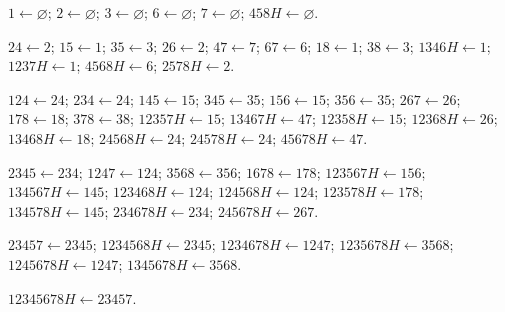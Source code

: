 \documentclass[a4paper,fleqn,longmktitle]{cas-sc}
\theoremstyle{definition}
\theoremstyle{remark}
\begin{document}
\begin{description}[leftmargin=1.8em,style=nextline]
\item[$\mathcal A_1\leftarrow\mathcal A_0$]
$1\leftarrow\varnothing$;
$2\leftarrow\varnothing$;
$3\leftarrow\varnothing$;
$6\leftarrow\varnothing$;
$7\leftarrow\varnothing$;
$458H\leftarrow\varnothing$.

\item[$\mathcal A_2\leftarrow\mathcal A_1$]
$24\leftarrow2$; $15\leftarrow1$; $35\leftarrow3$;
$26\leftarrow2$; $47\leftarrow7$; $67\leftarrow6$;
$18\leftarrow1$; $38\leftarrow3$; $1346H\leftarrow1$;
$1237H\leftarrow1$; $4568H\leftarrow6$; $2578H\leftarrow2$.

\item[$\mathcal A_3\leftarrow\mathcal A_2$]
$124\leftarrow24$; $234\leftarrow24$; $145\leftarrow15$;
$345\leftarrow35$; $156\leftarrow15$; $356\leftarrow35$;
$267\leftarrow26$; $178\leftarrow18$; $378\leftarrow38$;
$12357H\leftarrow15$; $13467H\leftarrow47$;
$12358H\leftarrow15$; $12368H\leftarrow26$;
$13468H\leftarrow18$; $24568H\leftarrow24$;
$24578H\leftarrow24$; $45678H\leftarrow47$.

\item[$\mathcal A_4\leftarrow\mathcal A_3$]
$2345\leftarrow234$; $1247\leftarrow124$;
$3568\leftarrow356$; $1678\leftarrow178$;
$123567H\leftarrow156$; $134567H\leftarrow145$;
$123468H\leftarrow124$; $124568H\leftarrow124$;
$123578H\leftarrow178$; $134578H\leftarrow145$;
$234678H\leftarrow234$; $245678H\leftarrow267$.

\item[$\mathcal A_5\leftarrow\mathcal A_4$]
$23457\leftarrow2345$; $1234568H\leftarrow2345$;
$1234678H\leftarrow1247$; $1235678H\leftarrow3568$;
$1245678H\leftarrow1247$; $1345678H\leftarrow3568$.

\item[$\mathcal A_6\leftarrow\mathcal A_5$]
$12345678H\leftarrow23457$.
\end{description}

{\small


}
\end{document}
